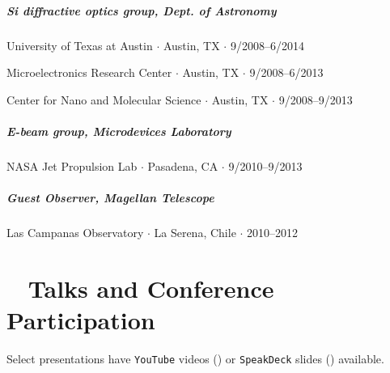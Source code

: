 \documentclass[10pt,letterpaper]{article}
\begin{document}
\subparagraph{Si diffractive optics group, Dept. of Astronomy}
University of Texas at Austin $\cdot$ Austin, TX $\cdot$ 9/2008--6/2014
\begin{flushright}
    Microelectronics Research Center $\cdot$ Austin, TX $\cdot$ 9/2008--6/2013

    Center for Nano and Molecular Science $\cdot$ Austin, TX $\cdot$ 9/2008--9/2013
\end{flushright}


\subparagraph{E-beam group, Microdevices Laboratory}
NASA Jet Propulsion Lab $\cdot$ Pasadena, CA $\cdot$ 9/2010--9/2013

\subparagraph{Guest Observer, Magellan Telescope}
Las Campanas Observatory $\cdot$ La Serena, Chile $\cdot$ 2010--2012


\section*{\faSlideshare ~ Talks and Conference Participation}

Select presentations have \texttt{YouTube} videos (\faYoutube) or \texttt{SpeakDeck} slides (\faSpeakerDeck) available.
\end{document}
